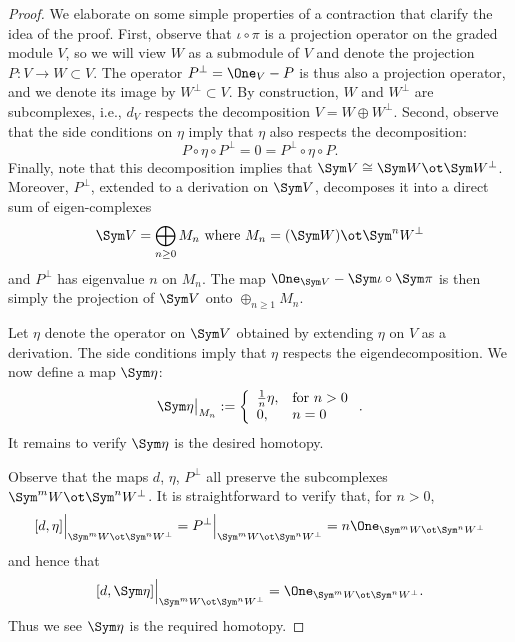\begin{proof}
We elaborate on some simple properties of a contraction that clarify the idea of the proof. First, observe that $\iota \circ \pi$ is a projection operator on the graded module $V$, so we will view $W$ as a submodule of $V$ and denote the projection $P: V \to W \subset V$. The operator $P^\perp = \One_V - P$ is thus also a projection operator, and we denote its image by $W^\perp \subset V$. By construction, $W$ and $W^\perp$ are subcomplexes, i.e., $d_V$ respects the decomposition $V = W \oplus W^\perp$. Second, observe that the side conditions on $\eta$ imply that $\eta$ also respects the decomposition:
\[
P \circ \eta \circ P^\perp = 0 = P^\perp \circ \eta \circ P.
\]
Finally, note that this decomposition implies that $\Sym V \cong \Sym W \ot \Sym W^\perp$. Moreover, $P^\perp$,  extended to a derivation on $\Sym V$, decomposes it into a direct sum of eigen-complexes
\[
\Sym V = \bigoplus_{n \geq 0} M_n \text{ where } M_n = (\Sym W) \ot \Sym^n W^\perp
\]
and $P^\perp$ has eigenvalue $n$ on $M_n$. The map $\One_{\Sym V} - \Sym \iota \circ \Sym \pi$ is then simply the projection of $\Sym V$ onto $\oplus_{n \geq 1} M_n$.

Let $\eta$ denote the operator on $\Sym V$ obtained by extending $\eta$ on $V$ as a derivation. The side conditions imply that $\eta$ respects the eigendecomposition. We now define a map $\Sym \eta$: 
\[
\Sym \eta \big|_{M_n} := \left\{
\begin{array}{ll} 
\frac{1}{n} \eta, & \text{for $n > 0$} \\ 
0, & n = 0
\end{array}
\right. .
\]
It remains to verify $\Sym \eta$ is the desired homotopy.

Observe that the maps $d$, $\eta$, $P^\perp$ all preserve the subcomplexes $\Sym^m W \ot \Sym^n W^\perp$. It is straightforward to verify that, for $n> 0$,
\[
[d, \eta ] \Big|_{\Sym^m W \ot \Sym^n W^\perp} = P^\perp\Big|_{\Sym^m W \ot \Sym^n W^\perp} = n \One_{\Sym^m W \ot \Sym^n W^\perp}
\]
and hence that
\[ 
[d, \Sym \eta ] \Big|_{\Sym^m W \ot \Sym^n W^\perp} = \One_{\Sym^m W \ot \Sym^n W^\perp}.
\]
Thus we see $\Sym \eta$ is the required homotopy.
\end{proof}

